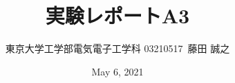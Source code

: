 \documentclass{ltjsarticle}
\title{実験レポートA3}
\author{東京大学工学部電気電子工学科 03210517\ 藤田 誠之 }
\date{May 6, 2021}
\begin{document}
\maketitle
\begin{comment}
\section{方法}
Xilinx Vivadoを用いてHDLシミュレーションを実行した.
\section{考察課題}
\subsection{1日目}
\subsubsection{AND回路の設計}

入力は2つのwire, 出力は1つのwireである. ２つの入力の論理積を出力する。
\begin{lstlisting}[caption=AND回路デザイン,language=verilog]
`timescale 1ns / 1ps
module and_gate (
    input wire inA,
    input wire inB,
    output wire out
);
    assign out = inA & inB;
endmodule
\end{lstlisting}
2入力の全部で4通りがある。テストベンチで100nsごとに入力を変化させた。
\begin{lstlisting}[caption=AND回路テストベンチ,language=verilog]
    module testbench;
    // parameter
    parameter CYCLE = 1000; // clock cycle
    parameter HALF_CYCLE = 500; // half cycle
    parameter DLY = 500; // delay
    // wire/reg
    reg clk;
    reg inA, inB;
    wire out_and_gate;
    // DUT module
    and_gate and_gate_0 (
        .inA(inA),
        .inB(inB),
        .out(out_and_gate)
    );
    // clock generator
    always begin
        clk = 1'b1;
        #(HALF_CYCLE) clk = 1'b0;
        #(HALF_CYCLE);
    end
    // test scenario
    initial begin
        // initialize
        inA = 1'b0; inB = 1'b0; 
        // for and_gate
        inA = 1'b0; inB = 1'b0;
        #100 $display("inA=%
        inA = 1'b1; inB = 1'b0;
        #100 $display("inA=%
        inA = 1'b0; inB = 1'b1;
        #100 $display("inA=%
        inA = 1'b1; inB = 1'b1;
        #100 $display("inA=%


\end{comment}
\end{document}
